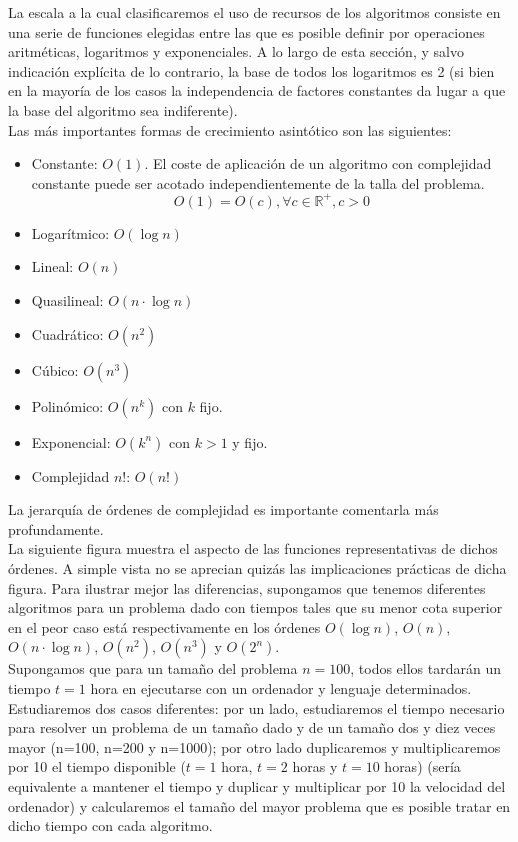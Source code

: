 La escala a la cual clasificaremos el uso de recursos de los algoritmos consiste en una serie de funciones elegidas entre las que es posible definir por operaciones aritméticas, logaritmos y exponenciales. A lo largo de esta sección, y salvo indicación explícita de lo contrario, la base de todos los logaritmos es 2 (si bien en la mayoría de los casos la independencia de factores constantes da lugar a que la base del algoritmo sea indiferente).\\
Las más importantes formas de crecimiento asintótico son las siguientes:\\
\begin{itemize}
\item Constante: $O(1)$. El coste de aplicación de un algoritmo con complejidad constante puede ser acotado independientemente de la talla del problema.
\[ O(1) = O(c), \forall c \in \mathbb{R}^+, c > 0 \]
\item Logarítmico: $O(\log n)$
\item Lineal: $O(n)$
\item Quasilineal: $O(n \cdot \log n)$
\item Cuadrático: $O(n^2)$
\item Cúbico: $O(n^3)$
\item Polinómico: $O(n^k)$ con $k$ fijo.
\item Exponencial: $O(k^n)$ con $k > 1$ y fijo.
\item Complejidad $n!$: $O(n!)$
\end{itemize}

La jerarquía de órdenes de complejidad es importante comentarla más profundamente.\\
La siguiente figura muestra el aspecto de las funciones representativas de dichos órdenes. A simple vista no se aprecian quizás las implicaciones prácticas de dicha figura. Para ilustrar mejor las diferencias, supongamos que tenemos diferentes algoritmos para un problema dado con tiempos tales que su menor cota superior en el peor caso está respectivamente en los órdenes $O(\log n)$, $O(n)$, $O(n \cdot \log n)$, $O(n^2)$, $O(n^3)$ y $O(2^n)$.\\

Supongamos que para un tamaño del problema $n = 100$, todos ellos tardarán un tiempo $t = 1$ hora en ejecutarse con un ordenador y lenguaje determinados. Estudiaremos dos casos diferentes: por un lado, estudiaremos el tiempo necesario para resolver un problema de un tamaño dado y de un tamaño dos y diez veces mayor (n=100, n=200 y n=1000); por otro lado duplicaremos y multiplicaremos por 10 el tiempo disponible ($t=1$ hora, $t=2$ horas y $t=10$ horas) (sería equivalente a mantener el tiempo y duplicar y multiplicar por 10 la velocidad del ordenador) y calcularemos el tamaño del mayor problema que es posible tratar en dicho tiempo con cada algoritmo.\\

